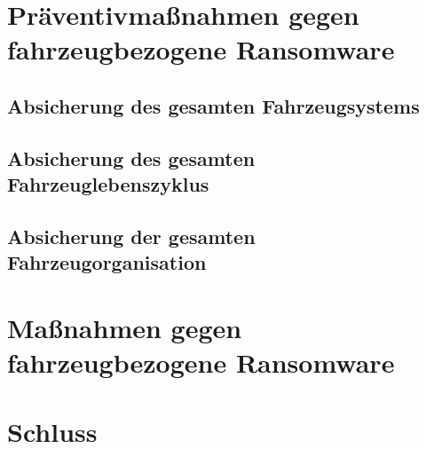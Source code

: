 \documentclass[oneside, 11pt, notitlepage, a4paper, numbers=noenddot]{scrartcl}
\begin{document}
\section{Präventivmaßnahmen gegen fahrzeugbezogene Ransomware}

\subsection{Absicherung des gesamten Fahrzeugsystems}

\subsection{Absicherung des gesamten Fahrzeuglebenszyklus}

\subsection{Absicherung der gesamten Fahrzeugorganisation}

\section{Maßnahmen gegen fahrzeugbezogene Ransomware}


\section{Schluss}




\end{document}

